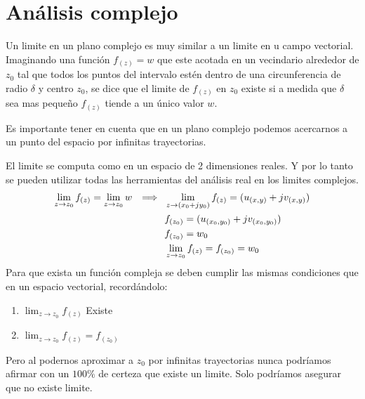 \chapter{Análisis complejo}
 \label{Continuidad y limites}
Un limite en un plano complejo es muy similar a un limite en u campo vectorial. Imaginando una función $f_{(z)}=w$ que este acotada en un vecindario alrededor de $z_0$ tal que todos los puntos del intervalo estén dentro de una circunferencia de radio $\delta$ y centro $z_0$, se dice que el limite de $f_{(z)}$ en $z_0$ existe si a medida que $\delta$ sea mas pequeño $f_{(z)}$ tiende a un único valor $w$. 
\begin{figure}[H]
    \centering
    \begin{minipage}{0.49\textwidth}
    \centering
        
    \end{minipage}
    \begin{minipage}{0.49\textwidth}
    \centering
        
    \end{minipage}
    \caption{}
\end{figure}


Es importante tener en cuenta que en un plano complejo podemos acercarnos a un punto del espacio por infinitas trayectorias.


El limite se computa como en un espacio de 2 dimensiones reales. Y por lo tanto se pueden utilizar todas las herramientas del análisis real en los limites complejos.
\begin{equation}
    \begin{aligned}
         \lim_{z\to z_0} f_{(z)}=\lim_{z\to z_0} w \hspace{0.25cm} \Longrightarrow \hspace{0.25cm} & \lim_{z\to(x_0+jy_0)} f_{(z)}=(u_{(x,y)}+jv_{(x,y)})\\
                                         &  f_{(z_0)}=(u_{(x_0,y_0)}+jv_{(x_0,y_0)})\\
                                         &  f_{(z_0)}=w_0\\
                                         &  \lim_{z\to z_0} f_{(z)}=f_{(z_0)}=w_0
    \end{aligned}
    \label{eq:DefLim}
\end{equation}
Para que exista un función compleja se deben cumplir las mismas condiciones que en un espacio vectorial, recordándolo:
    \begin{enumerate}
        \item $\lim_{z\to z_0} f_{(z)}$ Existe
        \item $\lim_{z\to z_0} f_{(z)} = f_{(z_0)}$
    \end{enumerate}
Pero al podernos aproximar a $z_0$ por infinitas trayectorias nunca podríamos afirmar con un $100\%$ de certeza que existe un limite. Solo podríamos asegurar que no existe limite.

